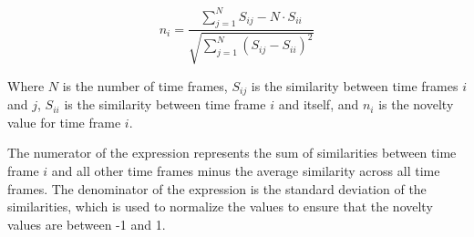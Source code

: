 \begin{equation}
n_i = \frac{\sum\limits_{j=1}^{N} S_{ij} - N\cdot S_{ii}}{\sqrt{\sum\limits_{j=1}^{N} (S_{ij} - S_{ii})^2}}
\end{equation}

Where $N$ is the number of time frames, $S_{ij}$ is the similarity between time frames $i$ and $j$, $S_{ii}$ is the similarity between time frame $i$ and itself, and $n_i$ is the novelty value for time frame $i$.

The numerator of the expression represents the sum of similarities between time frame $i$ and all other time frames minus the average similarity across all time frames. The denominator of the expression is the standard deviation of the similarities, which is used to normalize the values to ensure that the novelty values are between -1 and 1.
